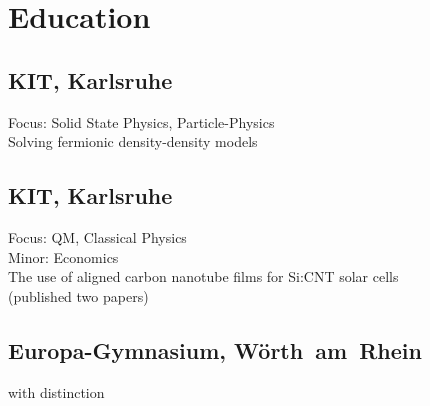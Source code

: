 \documentclass[]{deedy-resume-openfont}
\begin{document}
%
%
\lastupdated

%
%

%
%

\begin{minipage}[t]{0.33\textwidth} 


\section{Education} 

\subsection{KIT, Karlsruhe}
Focus: Solid State Physics, Particle-Physics\\
 Solving fermionic density-density models
\sectionsep

\subsection{KIT, Karlsruhe}
Focus: QM, Classical Physics\\
Minor: Economics\\
 The use of aligned carbon nanotube films for Si:CNT solar cells \\
(published two papers) %
\sectionsep

\subsection{Europa-Gymnasium, Wörth~am~Rhein}
with distinction
\sectionsep



\end{minipage}
\end{document}
